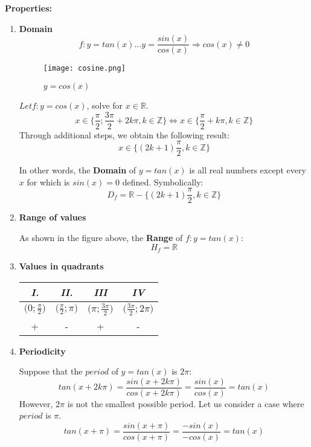 \documentclass{article}
\begin{document}
\textbf{Properties: }
\begin{enumerate}
    \item \textbf{Domain}
    \[
    f:y=tan(x) ... y=\frac{sin(x)}{cos(x)} \Rightarrow cos(x) \neq 0
    \]
    
    \begin{figure}[htp]
        \centering
        \texttt{[image: cosine.png]}
        \caption{$y=cos(x)$}
    \end{figure}    
    
    \textit{$Let f:y=cos(x)$}, solve for $x\in\mathbb{R}$.
    \[
    x \in \Big\{ \frac{\pi}{2}; \frac{3\pi}{2} + 2k\pi, k \in\mathbb{Z} \Big\} \Leftrightarrow
    x \in \Big\{ \frac{\pi}{2} + k\pi, k \in\mathbb{Z} \Big\}
    \]
    Through additional steps, we obtain the following result:
    \[
    x\in\{(2k+1)\frac{\pi}{2}, k\in\mathbb{Z} \}
    \]
    
    In other words, the \textbf{Domain} of $y=tan(x)$ is all real numbers except every $x$ for which is $sin(x) = 0$ defined. Symbolically:
    \[
    D_f= \mathbb{R}-\{ (2k+1)\frac{\pi}{2}, k\in\mathbb{Z} \}
    \]
    
    \item \textbf{Range of values}
    
    As shown in the figure above, the \textbf{Range} of $f: y=tan(x)$:
    \[
    H_f=\mathbb{R}
    \]
    
    \item \textbf{Values in quadrants}
    
    \begin{center}
    \begin{tabular}{||c c c c||} 
    \hline
    \textit{I.} & \textit{II.} & \textit{III} & \textit{IV} \\ [0.5ex] 
    \hline\hline
    $\Big(0;\frac{\pi}{2}\Big)$ & $\Big(\frac{\pi}{2};\pi\Big)$ & $\Big(\pi;\frac{3\pi}{2}\Big)$ & 
    $\Big(\frac{3\pi}{2};2\pi\Big)$ \\
    \hline
    + & - & + & - \\ [1ex] 
    \hline
    \end{tabular}
    \end{center}
    
    \item \textbf{Periodicity}
    
    Suppose that the $period$ of $y=tan(x)$ is $2\pi$: 
    \[
    tan(x + 2k\pi) = \frac{sin(x + 2k\pi)}{cos(x + 2k\pi)} = \frac{sin(x)}{cos(x)} = tan(x)
    \]
    However, $2\pi$ is not the smallest possible period. Let us consider a case where $period$ is $\pi$.
    \[
    tan(x + \pi) = \frac{sin(x +\pi)}{cos(x + \pi)} = \frac{-sin(x)}{-cos(x)} = tan(x)
    \]
    

\end{enumerate}
\end{document}

